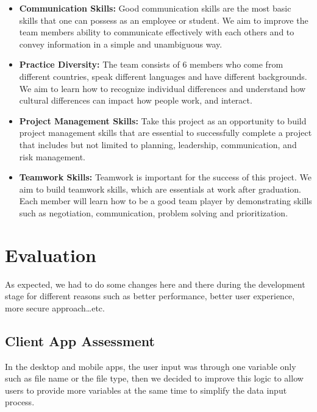 \documentclass{article}
\begin{document}
\begin{itemize}
\item \textbf{Communication Skills:} Good communication skills are the most basic skills that one can possess as an employee or student. We aim to improve the team members ability to communicate effectively with each others and to convey information in a simple and unambiguous way.
\item \textbf{Practice Diversity:} The team consists of 6 members who come from different countries, speak different languages and have different backgrounds. We aim to learn how to recognize individual differences and understand how cultural differences can impact how people work, and interact.
\item \textbf{Project Management Skills:} Take this project as an opportunity to build project management skills that are essential to successfully complete a project that includes but not limited to planning, leadership, communication, and risk management.
\item \textbf{Teamwork Skills:} Teamwork is important for the success of this project. We aim to build teamwork skills, which are essentials at work after graduation. Each member will learn how to be a good team player by demonstrating skills such as negotiation, communication, problem solving and prioritization.
\end{itemize}

\section{Evaluation}
As expected, we had to do some changes here and there during the development stage for different reasons such as better performance, better user experience, more secure approach…etc.


\subsection{Client App Assessment}
In the desktop and mobile apps, the user input was through one variable only such as file name or the file type, then we decided to improve this logic to allow users to provide more variables at the same time to simplify the data input process.
\newline
\end{document}
